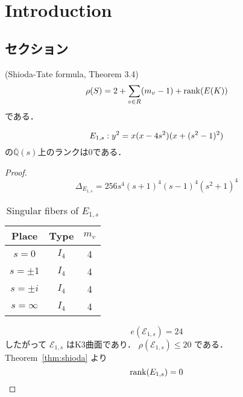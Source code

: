 \documentclass[main]{subfiles}
\begin{document}
\chapter{Introduction}
\section{セクション}

\begin{thm}{(Shioda-Tate formula, \cite{ref:naskrecki2013} Theorem 3.4)}
    \label{thm:shioda}
    \begin{equation}
        \rho (S) = 2 + \sum_{v \in R} (m_{v} - 1) + \operatorname{rank}(E(K))
    \end{equation}
    である．
\end{thm}

\begin{thm}
    \begin{equation}
        \label{eq:E_{1s}}
        E_{1,s}: y^{2} = x(x - 4s^{2})(x + (s^{2} - 1)^{2})
    \end{equation}
    の$\overline{\mathbb{Q}}(s)$上のランクは0である．
\end{thm}
\begin{proof}
    \begin{equation}
        \Delta_{E_{1,s}} = 256s^{4} (s + 1)^{4} (s - 1)^{4} (s^{2} + 1)^{4}
    \end{equation}

    \begin{table}[h]
        \centering
        \caption{Singular fibers of $E_{1,s}$}
        \begin{tabular}{|c|c|c|}
            \hline
            Place      & Type  & $m_v$ \\
            \hline
            $s=0$      & $I_4$ & 4     \\
            $s=\pm 1$  & $I_4$ & 4     \\
            $s=\pm i$  & $I_4$ & 4     \\
            $s=\infty$ & $I_4$ & 4     \\
            \hline
        \end{tabular}
    \end{table}

    \begin{equation}
        e(\mathcal{E}_{1,s}) = 24
    \end{equation}
    したがって $\mathcal{E}_{1,s}$ はK3曲面であり． $\rho(\mathcal{E}_{1,s}) \leq 20$ である．
    Theorem~\ref{thm:shioda} より
    \begin{equation}
        \operatorname{rank}(E_{1,s}) = 0
    \end{equation}
\end{proof}
\end{document}
